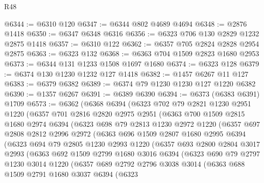 \begin{lexlean}{R48}
\begin{coremodule}
@6344 := @6310 @120
@6347 := @6344 @802 @4689 @4694
@6348 := @2876 @1418
@6350 := @6347 @6348 @6316
@6356 := @6323 @706 @130 @2829 @1232 @2875 @1418
@6357 := @6310 @122
@6362 := @6357 @705 @2824 @2828 @2954 @2875
@6363 := @6323 @132
@6368 := @6363 @704 @1509 @2823 @1680 @2953
@6373 := @6344 @131 @1233 @1508 @1697 @1680
@6374 := @6323 @128
@6379 := @6374 @130 @1230 @1232 @127 @1418
@6382 := @1457 @6267 @11 @127
@6383 := @6379 @6382
@6389 := @6374 @79 @1230 @1230 @127 @1220 @6382
@6390 := @1357 @6267
@6391 := @6389 @6390
@6394 := @6373 (@6383 @6391) @1709
@6573 := @6362
    (@6368
      @6394
      (@6323
        @702
        @79
        @2821
        @1230
        @2951
        @1220
        (@6357
          @701
          @2816
          @2820
          @2975
          @2951
          (@6363
            @700
            @1509
            @2815
            @1680
            @2974
            @6394
            (@6323
              @698
              @79
              @2813
              @1230
              @2972
              @1220
              (@6357
                @697
                @2808
                @2812
                @2996
                @2972
                (@6363
                  @696
                  @1509
                  @2807
                  @1680
                  @2995
                  @6394
                  (@6323
                    @694
                    @79
                    @2805
                    @1230
                    @2993
                    @1220
                    (@6357
                      @693
                      @2800
                      @2804
                      @3017
                      @2993
                      (@6363
                        @692
                        @1509
                        @2799
                        @1680
                        @3016
                        @6394
                        (@6323
                          @690
                          @79
                          @2797
                          @1230
                          @3014
                          @1220
                          (@6357
                            @689
                            @2792
                            @2796
                            @3038
                            @3014
                            (@6363
                              @688
                              @1509
                              @2791
                              @1680
                              @3037
                              @6394
                              (@6323

\end{coremodule}
\end{lexlean}
